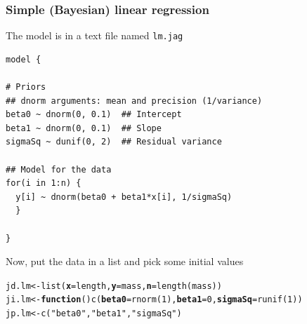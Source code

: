 \documentclass[color=usenames,dvipsnames]{beamer}\usepackage[]{graphicx}\usepackage[]{color}
\makeatletter
\newcommand{\hlnum}[1]{\textcolor[rgb]{0.69,0.494,0}{#1}}%
\newcommand{\hlstr}[1]{\textcolor[rgb]{0.749,0.012,0.012}{#1}}%
\newcommand{\hlstd}[1]{\textcolor[rgb]{0,0,0}{#1}}%
\newcommand{\hlkwa}[1]{\textcolor[rgb]{0,0,0}{\textbf{#1}}}%
\newcommand{\hlkwb}[1]{\textcolor[rgb]{0,0.341,0.682}{#1}}%
\newcommand{\hlkwc}[1]{\textcolor[rgb]{0,0,0}{\textbf{#1}}}%
\newcommand{\hlkwd}[1]{\textcolor[rgb]{0.004,0.004,0.506}{#1}}%
\newenvironment{kframe}{%
 \def\at@end@of@kframe{}%
 \ifinner\ifhmode%
  \def\at@end@of@kframe{\end{minipage}}%
  \begin{minipage}{\columnwidth}%
 \fi\fi%
 \def\FrameCommand##1{\hskip\@totalleftmargin \hskip-\fboxsep
 \colorbox{shadecolor}{##1}\hskip-\fboxsep
     \hskip-\linewidth \hskip-\@totalleftmargin \hskip\columnwidth}%
 \MakeFramed {\advance\hsize-\width
   \@totalleftmargin\z@ \linewidth\hsize
   \@setminipage}}%
 {\par\unskip\endMakeFramed%
 \at@end@of@kframe}
\newenvironment{knitrout}{}{} %
\makeatother
\begin{document}
\begin{frame}[fragile]
  \frametitle{Simple (Bayesian) linear regression}
  \small
  The model is in a text file named {\tt lm.jag} \\
\begin{knitrout}\scriptsize
{}\color{fgcolor}\begin{kframe}
\begin{verbatim}
model {

# Priors
## dnorm arguments: mean and precision (1/variance)
beta0 ~ dnorm(0, 0.1)  ## Intercept  
beta1 ~ dnorm(0, 0.1)  ## Slope
sigmaSq ~ dunif(0, 2)  ## Residual variance

## Model for the data
for(i in 1:n) {
  y[i] ~ dnorm(beta0 + beta1*x[i], 1/sigmaSq)
  }

}
\end{verbatim}
\end{kframe}
\end{knitrout}
\pause
\vfill
Now, put the data in a list and pick some initial values
\begin{knitrout}\footnotesize
{}\color{fgcolor}\begin{kframe}
\begin{alltt}
\hlstd{jd.lm} \hlkwb{<-} \hlkwd{list}\hlstd{(}\hlkwc{x}\hlstd{=length,} \hlkwc{y}\hlstd{=mass,} \hlkwc{n}\hlstd{=}\hlkwd{length}\hlstd{(mass))}
\hlstd{ji.lm} \hlkwb{<-} \hlkwa{function}\hlstd{()} \hlkwd{c}\hlstd{(}\hlkwc{beta0}\hlstd{=}\hlkwd{rnorm}\hlstd{(}\hlnum{1}\hlstd{),} \hlkwc{beta1}\hlstd{=}\hlnum{0}\hlstd{,} \hlkwc{sigmaSq}\hlstd{=}\hlkwd{runif}\hlstd{(}\hlnum{1}\hlstd{))}
\hlstd{jp.lm} \hlkwb{<-} \hlkwd{c}\hlstd{(}\hlstr{"beta0"}\hlstd{,} \hlstr{"beta1"}\hlstd{,} \hlstr{"sigmaSq"}\hlstd{)}
\end{alltt}
\end{kframe}
\end{knitrout}
\end{frame}
\end{document}
